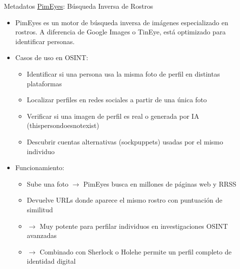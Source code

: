 \documentclass[aspectratio=169,11pt]{beamer}
\begin{document}
\begin{frame}[allowframebreaks]{Metadatos}
\small
\href{pimeyes.com/es}{PimEyes}: Búsqueda Inversa de Rostros
  \begin{itemize}
  \item PimEyes es un motor de búsqueda inversa de imágenes especializado en rostros. A diferencia de Google Images o TinEye, está optimizado para identificar personas.
  \item Casos de uso en OSINT:
   \begin{itemize}
  \item Identificar si una persona usa la misma foto de perfil en distintas plataformas
  \item Localizar perfiles en redes sociales a partir de una única foto
  \item Verificar si una imagen de perfil es real o generada por IA (thispersondoesnotexist)
  \item Descubrir cuentas alternativas (sockpuppets) usadas por el mismo individuo
    \end{itemize}

  \item Funcionamiento:

    \begin{itemize}

  \item Sube una foto $\rightarrow$ PimEyes busca en millones de páginas web y RRSS
  \item Devuelve URLs donde aparece el mismo rostro con puntuación de similitud
  \item $\rightarrow$ Muy potente para perfilar individuos en investigaciones OSINT avanzadas
  \item $\rightarrow$ Combinado con Sherlock o Holehe permite un perfil completo de identidad digital
    \end{itemize}

  \end{itemize}
\end{frame}
\end{document}
